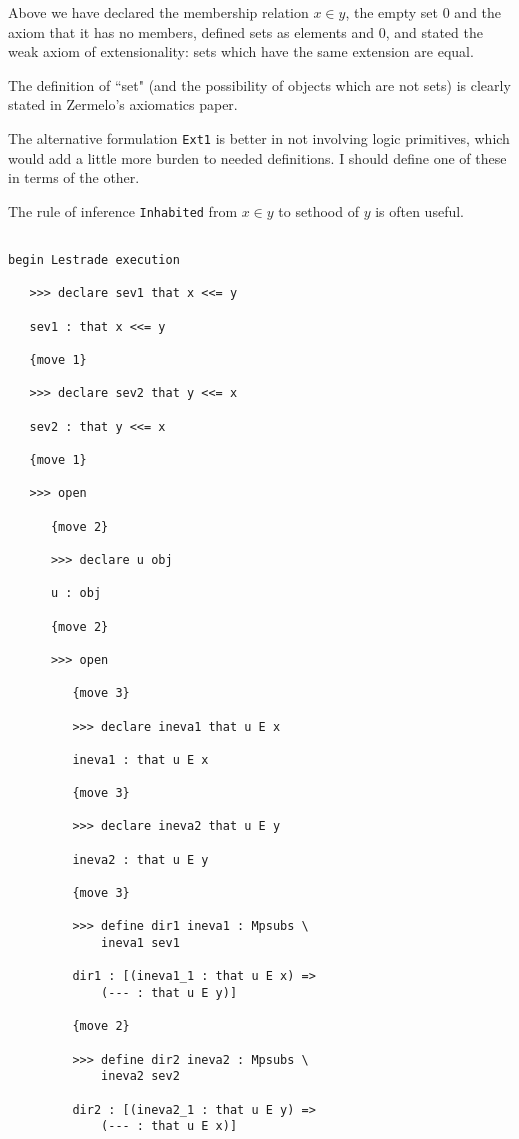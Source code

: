 \documentclass[12pt]{article}
\begin{document}
Above we have declared the membership relation $x \in y$, the empty set 0 and the axiom that it has no members, defined sets as elements and 0, and stated the weak axiom of extensionality:  sets which have the same extension are equal.

The definition of ``set" (and the possibility of objects which are not sets) is clearly stated in Zermelo's axiomatics paper.

The alternative formulation {\tt Ext1} is better in not involving logic primitives, which would add a little more burden to needed definitions.  I should define one of these in terms of the other.

The  rule of inference {\tt Inhabited} from $x \in y$ to sethood of $y$ is often useful.

\begin{verbatim}

begin Lestrade execution

   >>> declare sev1 that x <<= y

   sev1 : that x <<= y

   {move 1}

   >>> declare sev2 that y <<= x

   sev2 : that y <<= x

   {move 1}

   >>> open

      {move 2}

      >>> declare u obj

      u : obj

      {move 2}

      >>> open

         {move 3}

         >>> declare ineva1 that u E x

         ineva1 : that u E x

         {move 3}

         >>> declare ineva2 that u E y

         ineva2 : that u E y

         {move 3}

         >>> define dir1 ineva1 : Mpsubs \
             ineva1 sev1

         dir1 : [(ineva1_1 : that u E x) => 
             (--- : that u E y)]

         {move 2}

         >>> define dir2 ineva2 : Mpsubs \
             ineva2 sev2

         dir2 : [(ineva2_1 : that u E y) => 
             (--- : that u E x)]


\end{verbatim}
\end{document}
